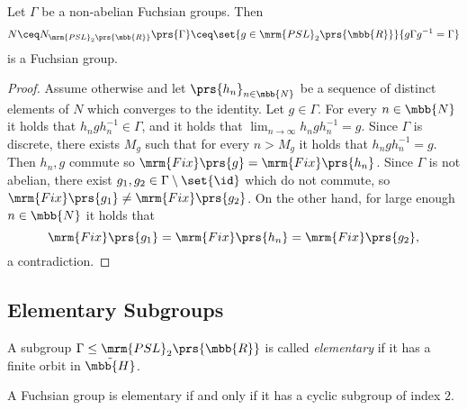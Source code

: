 \documentclass[10pt, twoside]{book}
\begin{document}
\begin{theorem}
Let $\Gamma$ be a non-abelian Fuchsian groups. Then
\[N \ceq N_{\mrm{PSL}_2\prs{\mbb{R}}}\prs{\Gamma} \ceq \set{g \in \mrm{PSL}_2\prs{\mbb{R}}}{g \Gamma g^{-1} = \Gamma}\]
is a Fuchsian group.
\end{theorem}

\begin{proof}
Assume otherwise and let $\prs{h_n}_{n \in \mbb{N}}$ be a sequence of distinct elements of $N$ which converges to the identity.
Let $g \in \Gamma$. For every $n \in \mbb{N}$ it holds that $h_n g h_n^{-1} \in \Gamma$, and it holds that $\lim_{n\to\infty} h_n g h_n^{-1} = g$. Since $\Gamma$ is discrete, there exists $M_g$ such that for every $n > M_g$ it holds that $h_n g h_n^{-1} = g$. Then $h_n,g$ commute so $\mrm{Fix}\prs{g} = \mrm{Fix}\prs{h_n}$.
Since $\Gamma$ is not abelian, there exist $g_1,g_2 \in \Gamma \setminus \set{\id}$ which do not commute, so $\mrm{Fix}\prs{g_1} \neq \mrm{Fix}\prs{g_2}$.
On the other hand, for large enough $n \in \mbb{N}$ it holds that
\[\mrm{Fix}\prs{g_1} = \mrm{Fix}\prs{h_n} = \mrm{Fix}\prs{g_2} \text{,}\]
a contradiction.
\end{proof}

\subsection{Elementary Subgroups}

\begin{definition}
A subgroup $\Gamma \leq \mrm{PSL}_2\prs{\mbb{R}}$ is called \emph{elementary} if it has a finite orbit in $\tilde{\mbb{H}}$.
\end{definition}

\begin{lemma}
A Fuchsian group is elementary if and only if it has a cyclic subgroup of index $2$.
\end{lemma}
\end{document}

